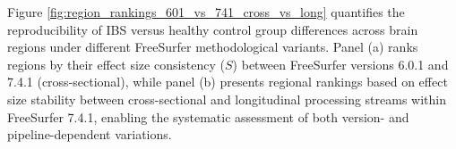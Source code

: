 \documentclass[diagnostics,article,accept,pdftex,moreauthors]{Definitions/mdpi}
\begin{document}
Figure \ref{fig:region_rankings_601_vs_741_cross_vs_long} quantifies the reproducibility of IBS versus healthy control group differences across brain regions under different FreeSurfer methodological variants. Panel (a) ranks regions by their effect size consistency ($S$) between FreeSurfer versions 6.0.1 and 7.4.1 (cross-sectional), while panel (b) presents regional rankings based on effect size stability between cross-sectional and longitudinal processing streams within FreeSurfer 7.4.1, enabling the systematic assessment of both version- and pipeline-dependent variations.


\begin{figure}[H]



\end{figure}
\end{document}
